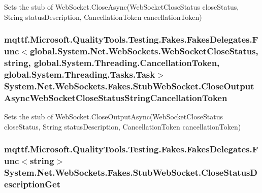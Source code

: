 Sets the stub of Web\-Socket.\-Close\-Async(\-Web\-Socket\-Close\-Status close\-Status, String status\-Description, Cancellation\-Token cancellation\-Token)

\hypertarget{class_system_1_1_net_1_1_web_sockets_1_1_fakes_1_1_stub_web_socket_a33b410a632483aa661b7ee8a68bcaa1a}{
\subsubsection[{Close\-Output\-Async\-Web\-Socket\-Close\-Status\-String\-Cancellation\-Token}]{\setlength{\rightskip}{0pt plus 5cm}mqttf.\-Microsoft.\-Quality\-Tools.\-Testing.\-Fakes.\-Fakes\-Delegates.\-Func$<$global.\-System.\-Net.\-Web\-Sockets.\-Web\-Socket\-Close\-Status, string, global.\-System.\-Threading.\-Cancellation\-Token, global.\-System.\-Threading.\-Tasks.\-Task$>$ System.\-Net.\-Web\-Sockets.\-Fakes.\-Stub\-Web\-Socket.\-Close\-Output\-Async\-Web\-Socket\-Close\-Status\-String\-Cancellation\-Token}}\label{class_system_1_1_net_1_1_web_sockets_1_1_fakes_1_1_stub_web_socket_a33b410a632483aa661b7ee8a68bcaa1a}


Sets the stub of Web\-Socket.\-Close\-Output\-Async(\-Web\-Socket\-Close\-Status close\-Status, String status\-Description, Cancellation\-Token cancellation\-Token)

\hypertarget{class_system_1_1_net_1_1_web_sockets_1_1_fakes_1_1_stub_web_socket_a741f1454527230b47fd65143ae600061}{
\subsubsection[{Close\-Status\-Description\-Get}]{\setlength{\rightskip}{0pt plus 5cm}mqttf.\-Microsoft.\-Quality\-Tools.\-Testing.\-Fakes.\-Fakes\-Delegates.\-Func$<$string$>$ System.\-Net.\-Web\-Sockets.\-Fakes.\-Stub\-Web\-Socket.\-Close\-Status\-Description\-Get}}\label{class_system_1_1_net_1_1_web_sockets_1_1_fakes_1_1_stub_web_socket_a741f1454527230b47fd65143ae600061}


